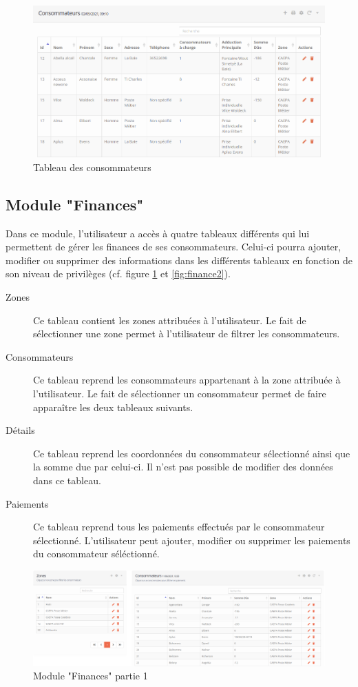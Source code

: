 \documentclass{EPL-master-thesis-covers-FR}
\begin{document}
				\begin{figure}[H]
					\centering
					\includegraphics[width=1\textwidth]{images/consumer_tab1}
					\caption{Tableau des consommateurs}
				\end{figure}
			

			\subsection*{Module "Finances"}
				Dans ce module, l'utilisateur a accès à quatre tableaux différents qui lui permettent de gérer les finances de ses consommateurs. Celui-ci pourra ajouter, modifier ou supprimer des informations dans les différents tableaux en fonction de son niveau de privilèges (cf. figure \ref{fig:finance1} et \ref{fig:finance2}).
				
				\begin{description}
					\item[Zones] Ce tableau contient les zones attribuées à l'utilisateur. Le fait de sélectionner une zone permet à l'utilisateur de filtrer les consommateurs.
					\item[Consommateurs] Ce tableau reprend les consommateurs appartenant à la zone attribuée à l'utilisateur. Le fait de sélectionner un consommateur permet de faire apparaître les deux tableaux suivants.
					\item[Détails] Ce tableau reprend les coordonnées du consommateur sélectionné ainsi que la somme due par celui-ci. Il n'est pas possible de modifier des données dans ce tableau.
					\item[Paiements] Ce tableau reprend tous les paiements effectués par le consommateur sélectionné. L'utilisateur peut ajouter, modifier ou supprimer les paiements du consommateur séléctionné.
				\end{description}
				
				\begin{figure}[H]
					\centering
					\includegraphics[width=1\textwidth]{images/finances1}
					\caption{Module "Finances" partie 1}
					\label{fig:finance1}
				\end{figure}
				
\end{document}

